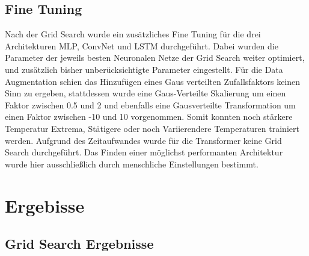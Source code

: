 \documentclass[acmtog, authorversion]{acmart} %
\begin{document}
\subsection{Fine Tuning}
Nach der Grid Search wurde ein zusätzliches Fine Tuning für die drei Architekturen MLP, ConvNet und LSTM durchgeführt. Dabei wurden die Parameter der jeweils besten Neuronalen Netze der Grid Search weiter optimiert, und zusätzlich bisher unberücksichtigte Parameter eingestellt. Für die Data Augmentation schien das Hinzufügen eines Gaus verteilten Zufallsfaktors keinen Sinn zu ergeben, stattdessen wurde eine Gaus-Verteilte Skalierung um einen Faktor zwischen 0.5 und 2 und ebenfalls eine Gausverteilte Transformation um einen Faktor zwischen -10 und 10 vorgenommen. Somit konnten noch stärkere Temperatur Extrema, Stätigere oder noch Variierendere Temperaturen trainiert werden.
Aufgrund des Zeitaufwandes wurde für die Transformer keine Grid Search durchgeführt. Das Finden einer möglichst performanten Architektur wurde hier ausschließlich durch menschliche Einstellungen bestimmt.  


\section{Ergebisse}

\subsection{Grid Search Ergebnisse}
\end{document}
